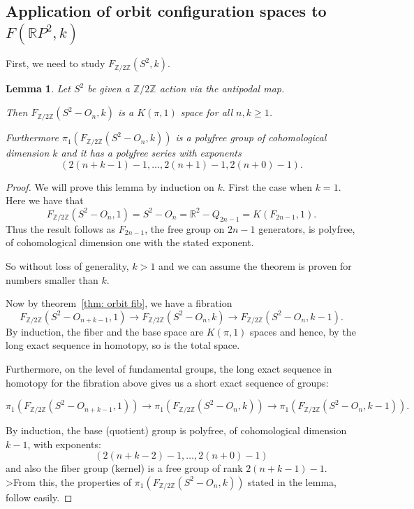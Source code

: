 \documentclass{amsart}
\newtheorem{lem}[thm]{Lemma}
\newcommand{\RR}{\mathbb{R}}
\begin{document}
\subsection{Application of orbit configuration spaces to 
$F(\RR P^2,k)$}

First, we need to study $F_{\mathbb{Z}/2\mathbb{Z}}(S^2,k)$.

\begin{lem}
\label{lem: orbitKpi1}
Let $S^2$ be given a $\mathbb{Z}/2\mathbb{Z}$ action
via the antipodal map. 

Then $F_{\mathbb{Z}/2\mathbb{Z}}(S^2 - O_n,k)$ is a $K(\pi,1)$
space for all $n,k \geq 1$. 

Furthermore $\pi_1(F_{\mathbb{Z}/2\mathbb{Z}}(S^2 - O_n,k))$ is
a polyfree group of cohomological dimension $k$ and it has
a polyfree series with exponents 
$$
(2(n+k-1)-1,\dots,2(n+1)-1,2(n+0)-1).
$$
\end{lem}
\begin{proof}
We will prove this lemma by induction on $k$. First the case when
$k=1$. Here we have that
$$
F_{\mathbb{Z}/2\mathbb{Z}}(S^2-O_n,1) = S^2-O_n = \mathbb{R}^2 - Q_{2n-1}
= K(F_{2n-1},1).
$$
Thus the result follows as $F_{2n-1}$, the free group on $2n-1$ generators,
is polyfree, of cohomological dimension one with the stated exponent.

So without loss of generality, $k>1$ and we can assume the theorem
is proven for numbers smaller than $k$.

Now by theorem~\ref{thm: orbit fib}, we have a fibration
$$
F_{\mathbb{Z}/2\mathbb{Z}}(S^2-O_{n+k-1},1) \rightarrow
F_{\mathbb{Z}/2\mathbb{Z}}(S^2-O_n,k) \rightarrow
F_{\mathbb{Z}/2\mathbb{Z}}(S^2-O_n,k-1).
$$
By induction, the fiber and the base space are $K(\pi,1)$ spaces
and hence, by the long exact sequence in homotopy, so is the total space.  

Furthermore, on the level of fundamental groups, the long exact
sequence in homotopy for the fibration above gives us a short exact
sequence of groups:

$$
\pi_1(F_{\mathbb{Z}/2\mathbb{Z}}(S^2-O_{n+k-1},1)) \rightarrow
\pi_1(F_{\mathbb{Z}/2\mathbb{Z}}(S^2-O_n,k)) \rightarrow
\pi_1(F_{\mathbb{Z}/2\mathbb{Z}}(S^2-O_n,k-1)).
$$

By induction, the base (quotient) group is polyfree, of cohomological 
dimension $k-1$,
with exponents:
$$
(2(n+k-2)-1,\dots,2(n+0)-1)
$$
and also the fiber group (kernel) is a free group of rank $2(n+k-1)-1$.
>From this, the properties of $\pi_1(F_{\mathbb{Z}/2\mathbb{Z}}(S^2-O_n,k))$
stated in the lemma, follow easily.
\end{proof}
\end{document}
